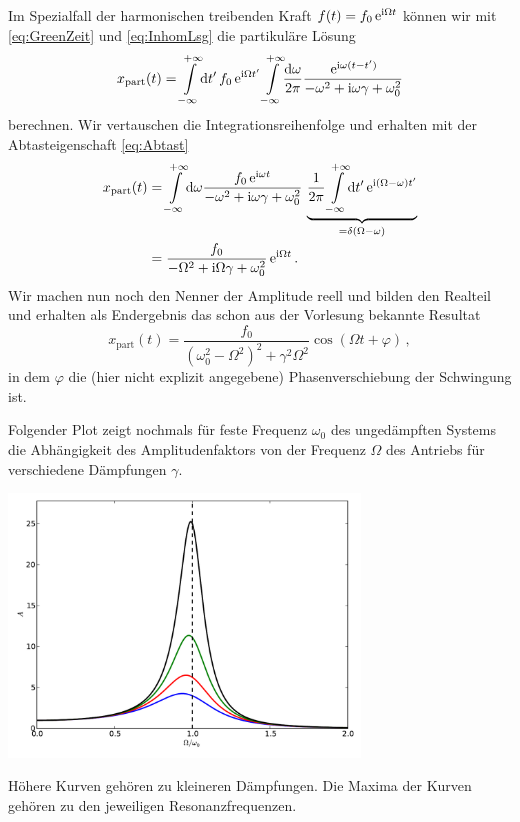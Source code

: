 \documentclass[paper=a4, fontsize=11.0pt, abstractoff, DIV12]{scrartcl}
\newcommand{\xinhom}{\ensuremath{x_\mathrm{part}}}
\begin{document}
Im Spezialfall der harmonischen treibenden Kraft $f(t) = f_0\,{\mathrm{e}}^{\mathrm{i}\Omega t}$
können wir mit \eqref{eq:GreenZeit} und \eqref{eq:InhomLsg} die partikuläre
Lösung
\begin{equation}
\xinhom(t) = \int\limits_{-\infty}^{+\infty}\!\dd t'\,f_0\eto{\ii\Omega t'} \int\limits_{-\infty}^{+\infty}\!\frac{\dd\omega}{2\pi}\frac{\eto{\ii\omega(t- t')}}{-\omega^2 + \ii\omega\gamma + \omega_0^2}
\end{equation}
berechnen. Wir vertauschen die Integrationsreihenfolge und erhalten mit der
Abtasteigenschaft \eqref{eq:Abtast}
\begin{align}
\xinhom(t) &= \int\limits_{-\infty}^{+\infty}\!{\dd\omega}\frac{f_0 \eto{\ii\omega t}}{-\omega^2 + \ii\omega\gamma + \omega_0^2}\,\underbrace{\frac{1}{2\pi}\int\limits_{-\infty}^{+\infty}\!\dd t' \eto{\ii (\Omega-\omega)t'}}_{=\delta(\Omega-\omega)}\\
&=\frac{f_0}{-\Omega^2 + \ii\Omega\gamma + \omega_0^2}\eto{\ii\Omega t}\,.
\end{align}
Wir machen nun noch den Nenner der Amplitude reell und bilden den Realteil und
erhalten als Endergebnis das schon aus der Vorlesung bekannte Resultat
\begin{equation}
\xinhom(t) = \frac{f_0}{(\omega_0^2 - \Omega^2)^2 + \gamma^2\Omega^2}\cos(\Omega t + \varphi)\,,
\end{equation}
in dem $\varphi$ die (hier nicht explizit angegebene) Phasenverschiebung der Schwingung
ist.

Folgender Plot zeigt nochmals für feste Frequenz $\omega_0$ des ungedämpften
Systems die Abhängigkeit des Amplitudenfaktors von der Frequenz $\Omega$ des
Antriebs für verschiedene Dämpfungen $\gamma$.
\begin{center}
    \includegraphics[width=0.7\textwidth]{ampl-plot.pdf}
\end{center}
Höhere Kurven gehören zu kleineren Dämpfungen. Die Maxima der Kurven gehören zu
den jeweiligen Resonanzfrequenzen.
\end{document}
